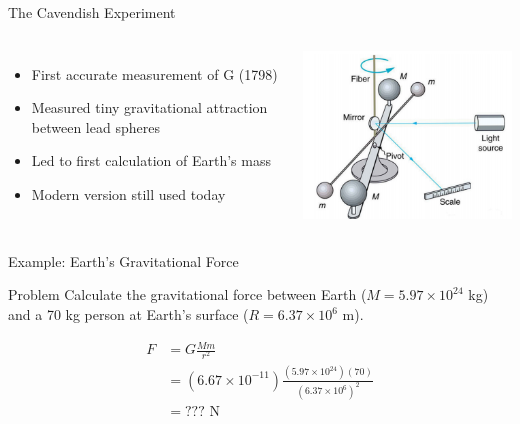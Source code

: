 \documentclass{beamer}
\begin{document}
\begin{frame}{The Cavendish Experiment}
    \begin{columns}
        \begin{itemize}
            \item First accurate measurement of G (1798)
            \item Measured tiny gravitational attraction between lead spheres
            \item Led to first calculation of Earth's mass
            \item Modern version still used today
        \end{itemize}
        \includegraphics[width=\textwidth]{cavend.png}
    \end{columns}
\end{frame}

\begin{frame}{Example: Earth's Gravitational Force}
    \begin{block}{Problem}
        Calculate the gravitational force between Earth ($M = 5.97 \times 10^{24}$ kg) and a 70 kg person at Earth's surface ($R = 6.37 \times 10^6$ m).
    \end{block}
    \begin{solution}
        \begin{align*}
            F &= G\frac{Mm}{r^2} \\
            &= (6.67 \times 10^{-11})\frac{(5.97 \times 10^{24})(70)}{(6.37 \times 10^6)^2} \\
            &= ??? \text{ N}
        \end{align*}
    \end{solution}
\end{frame}
\end{document}
